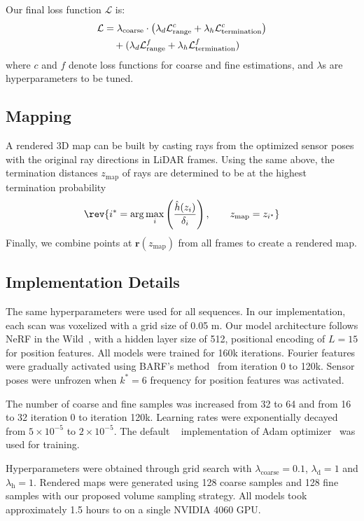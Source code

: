 Our final loss function $\mathcal{L}$ is:
\begin{align}
\mathcal{L} 
&= \lambda_\text{coarse} \cdot 
   \bigl(\lambda_d \mathcal{L}_\text{range}^c 
       + \lambda_h \mathcal{L}_\text{termination}^c \bigr) \notag \\
&\quad + (\lambda_d \mathcal{L}_\text{range}^f
       + \lambda_h \mathcal{L}_\text{termination}^f)
\label{eq:final_loss}
\end{align}
where  $c$ and $f$ denote loss functions for coarse and fine estimations, and $\lambda$s are hyperparameters to be tuned.

\subsection{Mapping}
A rendered 3D map can be built by casting rays from the optimized sensor poses with the original ray directions in LiDAR frames. Using the same  above, the termination distances $z_\text{map}$ of rays are determined to be at the  highest termination probability 
\begin{align}
	\rev{\label{eq:mapping_with_termination_density}
	i^* = \arg\max_{i} \left( \frac{\hat{h}(z_i)}{\delta_i} \right),
	\qquad
	z_{\text{map}} = z_{i^*}}
\end{align}
Finally, we combine points at $\mathbf{r}(z_\text{map})$ from all frames to create a rendered map.

\subsection{Implementation Details}\label{par:implementation_detail}
The same hyperparameters were used for all sequences. In our implementation, each scan was voxelized with a grid size of 0.05 m. %
Our model architecture follows NeRF in the Wild~\cite{martinbrualla2021nerfinwild}, with a hidden layer size of 512, positional encoding of $L=15$ for position features. All models were trained for 160k iterations. Fourier features were gradually activated using BARF's method~\cite{lin2021barf} from iteration 0 to 120k. Sensor poses were unfrozen when  $k^*=6$ frequency for position features was activated.  

The number of coarse and fine samples was increased from 32 to 64 and from 16 to 32  iteration 0 to iteration 120k. Learning rates were exponentially decayed from $5\times10^{-5}$ to $2\times10^{-5}$. %
The default ~\cite{paszke2019pytorch} implementation of  Adam optimizer~\cite{kingma2017adam} was used for training. 

Hyperparameters were obtained through grid search with $\lambda_\text{coarse}=0.1$, $\lambda_\text{d}=1$ and $\lambda_\text{h}=1$. Rendered maps were generated using 128 coarse samples and 128 fine samples with our proposed volume sampling strategy. All models took approximately 1.5 hours to  on a single NVIDIA  4060 GPU.